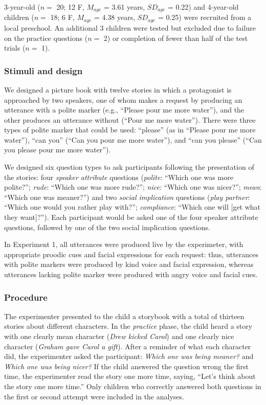 \documentclass[10pt, letterpaper]{article}
\begin{document}
3-year-old (\(n=\) 20; 12 F, \(M_{age}\) = 3.61 years, \(SD_{age}\) =
0.22) and 4-year-old children (\(n=\) 18; 6 F, \(M_{age}\) = 4.38 years,
\(SD_{age}\) = 0.25) were recruited from a local preschool. An
additional 3 children were tested but excluded due to failure on the
practice questions (\(n=\) 2) or completion of fewer than half of the
test trials (\(n=\) 1).

\subsubsection{Stimuli and design}\label{stimuli-and-design}

We designed a picture book with twelve stories in which a protagonist is
approached by two speakers, one of whom makes a request by producing an
utterance with a polite marker (e.g., ``Please pour me more water''),
and the other produces an utterance without (``Pour me more water'').
There were three types of polite marker that could be used: ``please''
(as in ``Please pour me more water''), ``can you'' (``Can you pour me
more water''), and ``can you please'' (``Can you please pour me more
water'').

We designed six question types to ask participants following the
presentation of the stories: four \emph{speaker attribute} questions
(\emph{polite}: ``Which one was more polite?''; \emph{rude}: ``Which one
was more rude?''; \emph{nice}: ``Which one was nicer?''; \emph{mean}:
``Which one was meaner?'') and two \emph{social implication} questions
(\emph{play partner}: ``Which one would you rather play with?'';
\emph{compliance}: ``Which one will {[}get what they want{]}?''). Each
participant would be asked one of the four speaker attribute questions,
followed by one of the two social implication questions.

In Experiment 1, all utterances were produced live by the experimeter,
with appropriate proodic cues and facial expressions for each request:
thus, utterances with polite markers were produced by kind voice and
facial expression, whereas utterances lacking polite marker were
produced with angry voice and facial cues.

\subsubsection{Procedure}\label{procedure}

The experimenter presented to the child a storybook with a total of
thirteen stories about different characters. In the \emph{practice}
phase, the child heard a story with one clearly mean character
(\emph{Drew kicked Carol}) and one clearly nice character (\emph{Graham
gave Carol a gift}). After a reminder of what each character did, the
experimenter asked the participant: \emph{Which one was being meaner?}
and \emph{Which one was being nicer?} If the child answered the question
wrong the first time, the experimenter read the story one more time,
saying, ``Let's think about the story one more time.'' Only children who
correctly answered both questions in the first or second attempt were
included in the analyses.
\end{document}
